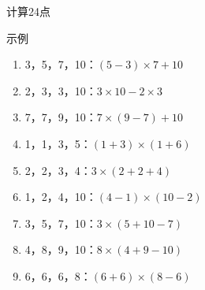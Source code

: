 \documentclass[aspectratio=169]{ctexbeamer} %
\begin{document}
\begin{frame}[t]{计算24点}
\begin{spacing}{1.2}
\normalsize
\alert{示例}
\begin{enumerate}[label={\arabic*.}]
\item 3，5，7，10：\pause $(5 - 3) \times 7 + 10$
\item 2，3，3，10：\pause $3 \times 10 - 2 \times 3$
\item 7，7，9，10：\pause $7 \times (9 - 7) + 10$
\item 1，1，3，5：\pause $(1 + 3) \times (1 + 6)$
\item 2，2，3，4：\pause $3 \times (2 + 2 + 4)$
\item 1，2，4，10：\pause $(4 - 1) \times (10 - 2)$
\item 3，5，7，10：\pause $3 \times (5 + 10 - 7)$
\item 4，8，9，10：\pause $8 \times (4 + 9 - 10)$
\item 6，6，6，8：\pause $(6 + 6) \times (8 - 6)$
\end{enumerate}
\end{spacing}
\end{frame}
\end{document}
